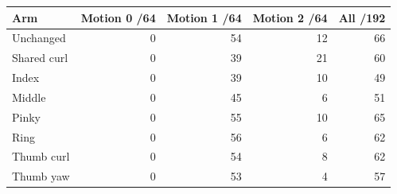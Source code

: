 \begin{tabular}{lrrrr}
\toprule
Arm & Motion 0 /64 & Motion 1 /64 & Motion 2 /64 & All /192\\
\midrule
Unchanged & 0 & 54 & 12 & 66\\
Shared curl & 0 & 39 & 21 & 60\\
Index & 0 & 39 & 10 & 49\\
Middle & 0 & 45 & 6 & 51\\
Pinky & 0 & 55 & 10 & 65\\
Ring & 0 & 56 & 6 & 62\\
Thumb curl & 0 & 54 & 8 & 62\\
Thumb yaw & 0 & 53 & 4 & 57\\
\bottomrule
\end{tabular}
